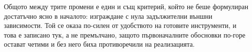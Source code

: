 Общото между трите промени е един и същ критерий, който не беше формулиран достатъчно
ясно в началото: изграждане с нула задължителни външни зависимости. Той се оказа по-силен
от удобството на готовите инструменти, и това е записано тук, а не премълчано, защото
първоначалните обосновки по-горе остават четими и без него биха противоречили на
реализацията.
